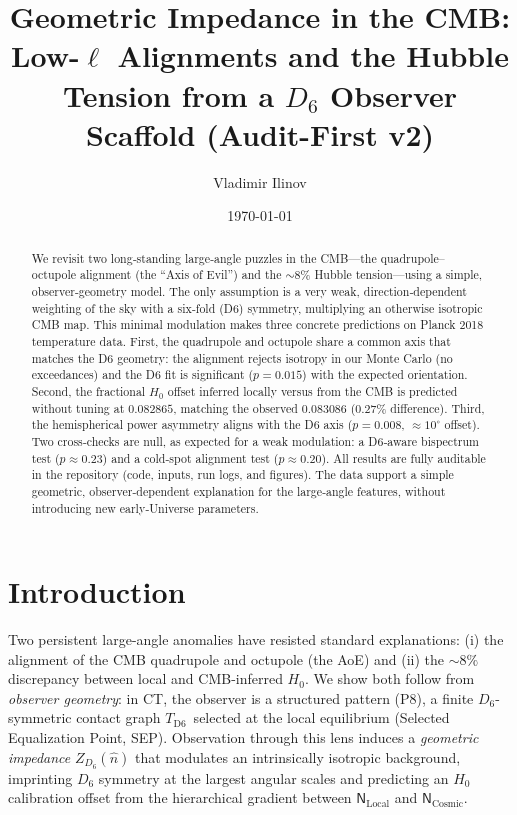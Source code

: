 \documentclass[reprint,aps,prl,twocolumn,nofootinbib,longbibliography]{revtex4-2}
\DeclareRobustCommand{\Nlocal}{\mathsf{N}_{\mathrm{Local}}}
\DeclareRobustCommand{\Ncosmic}{\mathsf{N}_{\mathrm{Cosmic}}}
\DeclareRobustCommand{\TDS}{\ensuremath{T_{\mathrm{D6}}}}
\begin{document}
\title{Geometric Impedance in the CMB: Low-\texorpdfstring{$\ell$}{l} Alignments and the Hubble Tension from a $D_6$ Observer Scaffold (Audit-First v2)}

\author{Vladimir Ilinov}
\date{\today}

\begin{abstract}
We revisit two long‑standing large‑angle puzzles in the CMB—the quadrupole–octupole alignment (the “Axis of Evil”) and the \(\sim\!8\%\) Hubble tension—using a simple, observer‑geometry model. The only assumption is a very weak, direction‑dependent weighting of the sky with a six‑fold (D6) symmetry, multiplying an otherwise isotropic CMB map. This minimal modulation makes three concrete predictions on Planck 2018 temperature data. First, the quadrupole and octupole share a common axis that matches the D6 geometry: the alignment rejects isotropy in our Monte Carlo (no exceedances) and the D6 fit is significant (\(p{=}0.015\)) with the expected orientation. Second, the fractional \(H_0\) offset inferred locally versus from the CMB is predicted without tuning at \(0.082865\), matching the observed \(0.083086\) (\(0.27\%\) difference). Third, the hemispherical power asymmetry aligns with the D6 axis (\(p{=}0.008\), \(\approx\!10^\circ\) offset). Two cross‑checks are null, as expected for a weak modulation: a D6‑aware bispectrum test (\(p\!\approx\!0.23\)) and a cold‑spot alignment test (\(p\!\approx\!0.20\)). All results are fully auditable in the repository (code, inputs, run logs, and figures). The data support a simple geometric, observer‑dependent explanation for the large‑angle features, without introducing new early‑Universe parameters.
\end{abstract}

\maketitle

\section{Introduction}
Two persistent large-angle anomalies have resisted standard explanations: (i) the alignment of the CMB quadrupole and octupole (the AoE) and (ii) the $\sim\!8\%$ discrepancy between local and CMB-inferred $H_0$. We show both follow from \emph{observer geometry}: in CT, the observer is a structured pattern (P8), a finite $D_6$-symmetric contact graph \TDS\ selected at the local equilibrium (Selected Equalization Point, SEP). Observation through this lens induces a \emph{geometric impedance} $Z_{D_6}(\hat{n})$ that modulates an intrinsically isotropic background, imprinting $D_6$ symmetry at the largest angular scales and predicting an $H_0$ calibration offset from the hierarchical gradient between $\Nlocal$ and $\Ncosmic$.
\end{document}
